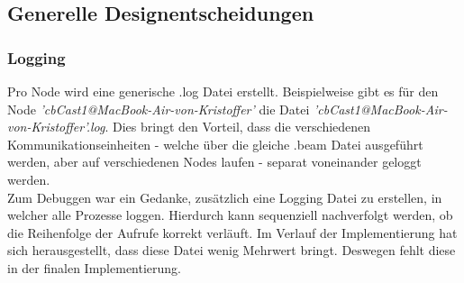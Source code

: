 \subsection{Generelle Designentscheidungen}

\subsubsection{Logging}

Pro Node wird eine generische .log Datei erstellt. Beispielweise gibt es für den Node \textit{'cbCast1@MacBook-Air-von-Kristoffer'} die Datei \textit{'cbCast1@MacBook-Air-von-Kristoffer'.log}. Dies bringt den Vorteil, dass die verschiedenen Kommunikationseinheiten - welche über die gleiche .beam Datei ausgeführt werden, aber auf verschiedenen Nodes laufen - separat voneinander geloggt werden.
\\Zum Debuggen war ein Gedanke, zusätzlich eine Logging Datei zu erstellen, in welcher alle Prozesse loggen. Hierdurch kann sequenziell nachverfolgt werden, ob die Reihenfolge der Aufrufe korrekt verläuft. Im Verlauf der Implementierung hat sich herausgestellt, dass diese Datei wenig Mehrwert bringt. Deswegen fehlt diese in der finalen Implementierung.